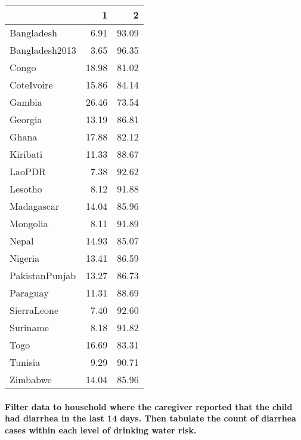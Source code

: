 \documentclass[
]{article}
\newenvironment{Shaded}{\begin{snugshade}}{\end{snugshade}}
\newcommand{\CommentTok}[1]{\textcolor[rgb]{0.56,0.35,0.01}{\textit{#1}}}
\newcommand{\DataTypeTok}[1]{\textcolor[rgb]{0.13,0.29,0.53}{#1}}
\newcommand{\DecValTok}[1]{\textcolor[rgb]{0.00,0.00,0.81}{#1}}
\newcommand{\KeywordTok}[1]{\textcolor[rgb]{0.13,0.29,0.53}{\textbf{#1}}}
\newcommand{\NormalTok}[1]{#1}
\newcommand{\OperatorTok}[1]{\textcolor[rgb]{0.81,0.36,0.00}{\textbf{#1}}}
\newcommand{\StringTok}[1]{\textcolor[rgb]{0.31,0.60,0.02}{#1}}
\begin{document}
\begin{longtable}[]{@{}lrr@{}}
\toprule
& 1 & 2\tabularnewline
\midrule
\endhead
Bangladesh & 6.91 & 93.09\tabularnewline
Bangladesh2013 & 3.65 & 96.35\tabularnewline
Congo & 18.98 & 81.02\tabularnewline
CoteIvoire & 15.86 & 84.14\tabularnewline
Gambia & 26.46 & 73.54\tabularnewline
Georgia & 13.19 & 86.81\tabularnewline
Ghana & 17.88 & 82.12\tabularnewline
Kiribati & 11.33 & 88.67\tabularnewline
LaoPDR & 7.38 & 92.62\tabularnewline
Lesotho & 8.12 & 91.88\tabularnewline
Madagascar & 14.04 & 85.96\tabularnewline
Mongolia & 8.11 & 91.89\tabularnewline
Nepal & 14.93 & 85.07\tabularnewline
Nigeria & 13.41 & 86.59\tabularnewline
PakistanPunjab & 13.27 & 86.73\tabularnewline
Paraguay & 11.31 & 88.69\tabularnewline
SierraLeone & 7.40 & 92.60\tabularnewline
Suriname & 8.18 & 91.82\tabularnewline
Togo & 16.69 & 83.31\tabularnewline
Tunisia & 9.29 & 90.71\tabularnewline
Zimbabwe & 14.04 & 85.96\tabularnewline
\bottomrule
\end{longtable}

\hypertarget{filter-data-to-household-where-the-caregiver-reported-that-the-child-had-diarrhea-in-the-last-14-days.-then-tabulate-the-count-of-diarrhea-cases-within-each-level-of-drinking-water-risk.}{%
\paragraph{Filter data to household where the caregiver reported that
the child had diarrhea in the last 14 days. Then tabulate the count of
diarrhea cases within each level of drinking water
risk.}\label{filter-data-to-household-where-the-caregiver-reported-that-the-child-had-diarrhea-in-the-last-14-days.-then-tabulate-the-count-of-diarrhea-cases-within-each-level-of-drinking-water-risk.}}

\begin{Shaded}
\end{Shaded}
\end{document}
